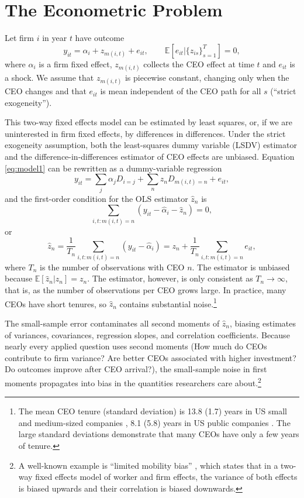 \documentclass[11pt,a4paper]{article}
\begin{document}
\section{The Econometric Problem}

Let firm $i$ in year $t$ have outcome
\begin{equation}\label{eq:model1}
  y_{it} = \alpha_i + z_{m(i,t)} + e_{it},\qquad \mathbb E[e_{it}|\{z_{is}\}_{s=1}^T]=0,
\end{equation}
where $\alpha_i$ is a firm fixed effect, $z_{m(i,t)}$ collects the CEO effect at time $t$ and $e_{it}$ is a shock. We assume that $z_{m(i,t)}$ is piecewise constant, changing only when the CEO changes and that $e_{it}$ is mean independent of the CEO path for all $s$ (``strict exogeneity'').

This two-way fixed effects model can be estimated by least squares, or, if we are uninterested in firm fixed effects, by differences in differences. Under the strict exogeneity assumption, both the least-squares dummy variable (LSDV) estimator and the difference-in-differences estimator of CEO effects are unbiased. Equation \eqref{eq:model1} can be rewritten as a dummy-variable regression 
$$
y_{it} = \sum_{j}\alpha_j D_{i=j} + \sum_{n} z_n D_{m(i,t)=n}  + e_{it},
$$
and the first-order condition for the OLS estimator $\hat z_n$ is
$$
\sum_{i,t:m(i,t)=n} (y_{it} - \hat\alpha_i - \hat z_n) =0,
$$
or 
$$
\hat z_n = \frac{1}{T_n} \sum_{i,t:m(i,t)=n} (y_{it} - \hat\alpha_i) = z_n + \frac{1}{T_n} \sum_{i,t:m(i,t)=n} e_{it},
$$
where $T_n$ is the number of observations with CEO $n$. The estimator is unbiased because $\mathbb E[\hat z_n|z_n] = z_n$. The estimator, however, is only consistent as $T_n\to\infty$, that is, as the number of observations per CEO grows large. In practice, many CEOs have short tenures, so $\hat z_n$ contains substantial noise.\footnote{The mean CEO tenure (standard deviation) is 13.8 (1.7) years in US small and medium-sized companies \citep{simsek2007ceo}, 8.1 (5.8) years in US public companies \citep{brookman2009ceo}. The large standard deviations demonstrate that many CEOs have only a few years of tenure.} 

The small-sample error contaminates all second moments of $\hat z_n$, biasing estimates of variances, covariances, regression slopes, and correlation coefficients. Because nearly every applied question uses second moments (How much do CEOs contribute to firm variance? Are better CEOs associated with higher investment? Do outcomes improve after CEO arrival?), the small-sample noise in first moments propagates into bias in the quantities researchers care about.\footnote{A well-known example is ``limited mobility bias'' \citep{andrews2008high}, which states that in a two-way fixed effects model of worker and firm effects, the variance of both effects is biased upwards and their correlation is biased downwards.}
\end{document}
